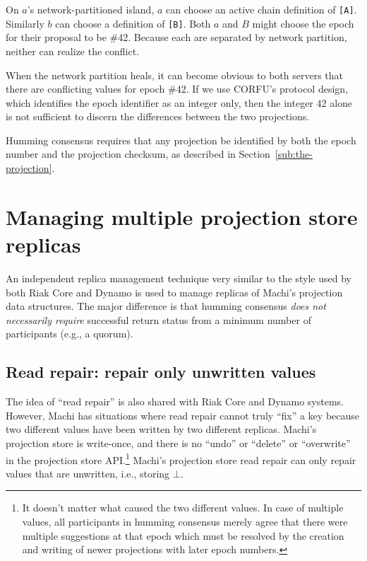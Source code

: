 \documentclass[preprint,10pt]{sigplanconf}
\begin{document}
On $a$'s network-partitioned island, $a$ can choose
an active chain definition of {\tt [A]}.
Similarly $b$ can choose a definition of {\tt [B]}.  Both $a$ and $B$
might choose the
epoch for their proposal to be \#42.  Because each are separated by
network partition, neither can realize the conflict.

When the network partition heals, it can become obvious to both
servers that there are conflicting values for epoch \#42.  If we
use CORFU's protocol design, which identifies the epoch identifier as
an integer only, then the integer 42 alone is not sufficient to
discern the differences between the two projections.

Humming consensus requires that any projection be identified by both
the epoch number and the projection checksum, as described in
Section~\ref{sub:the-projection}.

\section{Managing multiple projection store replicas}
\label{sec:managing-multiple-projection-stores}

An independent replica management technique very similar to the style
used by both Riak Core \cite{riak-core} and Dynamo is used to manage
replicas of Machi's projection data structures.
The major difference is that humming consensus
{\em does not necessarily require}
successful return status from a minimum number of participants (e.g.,
a quorum).

\subsection{Read repair: repair only unwritten values}

The idea of ``read repair'' is also shared with Riak Core and Dynamo
systems.  However, Machi has situations where read repair cannot truly
``fix'' a key because two different values have been written by two
different replicas.
Machi's projection store is write-once, and there is no ``undo'' or
``delete'' or ``overwrite'' in the projection store API.\footnote{It doesn't
matter what caused the two different values.  In case of multiple
values, all participants in humming consensus merely agree that there
were multiple suggestions at that epoch which must be resolved by the
creation and writing of newer projections with later epoch numbers.}
Machi's projection store read repair can only repair values that are
unwritten, i.e., storing $\bot$.
\end{document}
